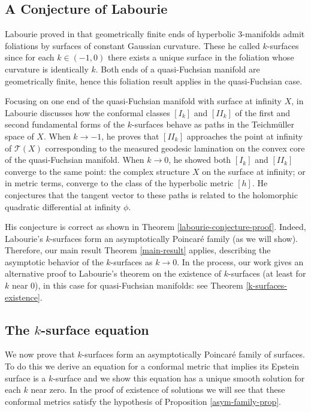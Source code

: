 \documentclass{amsart}
\newcommand{\two}{I\!\!I}
\begin{document}
\subsection{A Conjecture of Labourie}



Labourie proved in \cite{labourie1991} that geometrically finite ends of hyperbolic 3-manifolds admit foliations by surfaces of constant Gaussian curvature. 
These he called $k$-surfaces since for each $k \in (-1,0)$ there exists a unique surface in the foliation whose curvature is identically $k$.
Both ends of a quasi-Fuchsian manifold are geometrically finite, hence this foliation result applies in the quasi-Fuchsian case.

Focusing on one end of the quasi-Fuchsian manifold with surface at infinity $X$, in \cite{labourie1992} Labourie discusses how the conformal classes $[I_k]$ and $[\two_k]$ of the first and second fundamental forms of the $k$-surfaces behave as paths in the Teichm\"uller space of $X$. 
When $k \to -1$, he proves that $[\two_k]$ approaches the point at infinity of $\mathcal{T}(X)$ corresponding to the measured geodesic lamination on the convex core of the quasi-Fuchsian manifold. 
When $k \to 0$, he showed both $[I_k]$ and $[\two_k]$ converge to the same point: the complex structure $X$ on the surface at infinity; or in metric terms, converge to the class of the hyperbolic metric $[h]$.
He conjectures that the tangent vector to these paths is related to the holomorphic quadratic differential at infinity $\phi$. 

His conjecture is correct as shown in Theorem \ref{labourie-conjecture-proof}. 
Indeed, Labourie's $k$-surfaces form an asymptotically Poincar\'e family (as we will show). 
Therefore, our main result Theorem \ref{main-result} applies, describing the asymptotic behavior of the $k$-surfaces as $k \to 0$. 
In the process, our work gives an alternative proof to Labourie's theorem on the existence of $k$-surfaces (at least for $k$ near 0), in this case for quasi-Fuchsian manifolds: see Theorem \ref{k-surfaces-existence}.



\subsection{The $k$-surface equation}



We now prove that $k$-surfaces form an asymptotically Poincar\'e family of surfaces. 
To do this we derive an equation for a conformal metric that implies its Epstein surface is a $k$-surface and we show this equation has a unique smooth solution for each $k$ near zero. 
In the proof of existence of solutions we will see that these conformal metrics satisfy the hypothesis of Proposition \ref{asym-family-prop}. 
\end{document}
